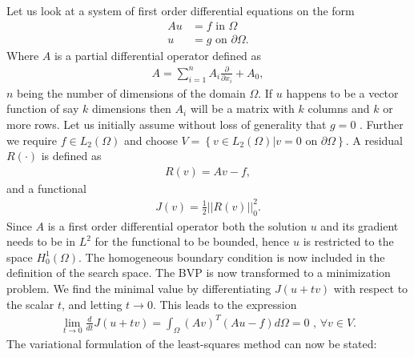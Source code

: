 Let us look at a system of first order differential equations on the form 
\begin{align}
	Au &= f \text{ in } \Omega \\
	u &= g \text{ on } \partial \Omega.
	\label{eq:PDE}
\end{align}
Where $A$ is a partial differential operator defined as 
\begin{align}
	A = \sum_{i = 1}^{n} A_i\frac{\partial}{\partial x_i} + A_0,
	\label{def:operatorA}
\end{align}
$n$ being the number of dimensions of the domain $\Omega$. If $u$ happens to be a vector function of say $k$ dimensions then $A_i$ will be a matrix with $k$ columns and $k$ or more rows. Let us initially assume without loss of generality that $g=0$ . Further we require $f \in L_2(\Omega)$ and choose $V = \left\{ v\in L_2(\Omega) | v = 0 \text{ on } \partial \Omega \right\}$. A residual $R(\cdot)$ is defined as
\begin{align}
	R(v) = Av-f,
	\label{eq:Residual}
\end{align}
and a functional
\begin{align}
	 J(v) = \frac{1}{2}||R(v)||^2_0.
	\label{eq:Functional}
\end{align} 
	Since $A$ is a first order differential operator both the solution $u$ and its gradient needs to be in $L^2$ for the functional to be bounded, hence $u$ is restricted to the space $H^1_0(\Omega)$. The homogeneous boundary condition is now included in the definition of the search space. The BVP is now transformed to a minimization problem. We find the minimal value by differentiating $J(u+tv)$ with respect to the scalar $t$, and letting $t\rightarrow 0$. This leads to the expression 
\begin{align}
	\lim_{t\rightarrow 0} \frac{d}{dt}J(u+tv) = \int_{\Omega}(Av)^T(Au-f)d\Omega = 0 \text{    ,   } \forall v \in V.
	\label{eq:minProb}
\end{align}
The variational formulation of the least-squares method can now be stated: 

